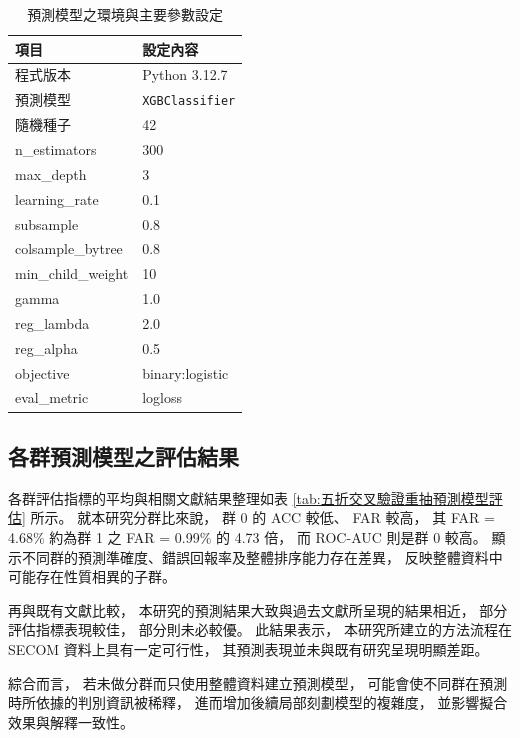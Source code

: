 \documentclass[12pt,a4paper,oneside]{book}
\begin{document}
	\begin{table}[H]
		\centering
		\caption{預測模型之環境與主要參數設定}
		\vspace{0.15cm}
		\label{tab:xgb_env_param}
		\begin{tabular}{|l|l|}
		\hline
		項目 & 設定內容 \\
		\hline
		程式版本 & Python 3.12.7 \\
		\hline
		預測模型 & \texttt{XGBClassifier} \\
		\hline
		隨機種子 & 42 \\
		\hline
		n\_estimators & 300 \\
		\hline
		max\_depth & 3 \\
		\hline
		learning\_rate & 0.1 \\
		\hline
		subsample & 0.8 \\
		\hline
		colsample\_bytree & 0.8 \\
		\hline
		min\_child\_weight & 10 \\
		\hline
		gamma & 1.0 \\
		\hline
		reg\_lambda & 2.0 \\
		\hline
		reg\_alpha & 0.5 \\
		\hline
		objective & binary:logistic \\
		\hline
		eval\_metric & logloss \\
		\hline
		\end{tabular}
	\end{table}
			
	\subsection{各群預測模型之評估結果}

	各群評估指標的平均與相關文獻結果整理如表 \ref{tab:五折交叉驗證重抽預測模型評估} 所示。
	就本研究分群比來說，
	群 0 的 ACC 較低、 FAR 較高，
	其 FAR = 4.68\% 約為群 1 之 FAR = 0.99\% 的 4.73 倍，
	而 ROC-AUC 則是群 0 較高。
	顯示不同群的預測準確度、錯誤回報率及整體排序能力存在差異，
	反映整體資料中可能存在性質相異的子群。

	再與既有文獻比較，
	本研究的預測結果大致與過去文獻所呈現的結果相近，
	部分評估指標表現較佳，
	部分則未必較優。
	此結果表示，
	本研究所建立的方法流程在 SECOM 資料上具有一定可行性，
	其預測表現並未與既有研究呈現明顯差距。

	綜合而言，
	若未做分群而只使用整體資料建立預測模型，
	可能會使不同群在預測時所依據的判別資訊被稀釋，
	進而增加後續局部刻劃模型的複雜度，
	並影響擬合效果與解釋一致性。
\end{document}
